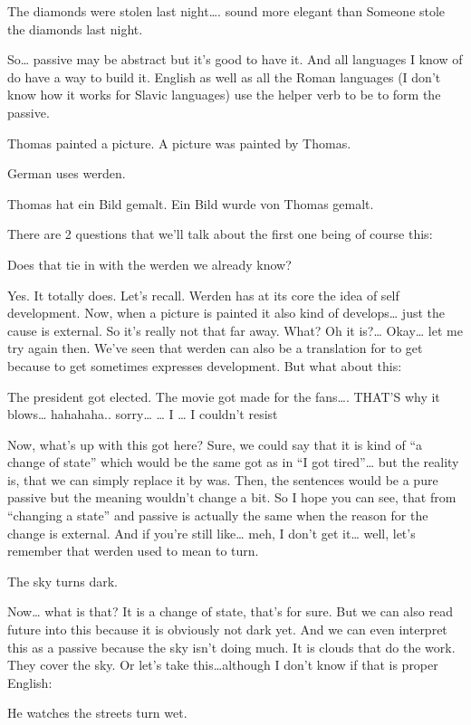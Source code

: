 \documentclass[a4paper,12pt]{article}
\begin{document}
\begin{adjustwidth}{2em}{0pt}
\begin{adjustwidth}{3em}{0pt}
    The diamonds were stolen last night…. sound more elegant than
    Someone stole the diamonds last night.

So… passive may be abstract but it’s good to have it. And all languages I know of do have a way to build it. English as well as all the Roman languages (I don’t know how it works for Slavic languages) use the helper verb to be to form the passive.

    Thomas painted a picture.
    A picture was painted by Thomas.

German uses werden.

    Thomas hat ein Bild gemalt.
    Ein Bild wurde von Thomas gemalt.

There are 2 questions that we’ll talk about the first one being of course this:

Does that tie in with the werden we already know?

Yes. It totally does. Let’s recall. Werden has at its core the idea of self development. Now, when a picture is painted it also kind of develops… just the cause is external. So it’s really not that far away. What? Oh it is?… Okay… let me try again then. We’ve seen that werden can also be a translation for to get because to get sometimes expresses development. But what about this:

    The president got elected.
    The movie got made for the fans…. THAT’S why it blows… hahahaha.. sorry… … I … I  couldn’t resist

Now, what’s up with this got here? Sure, we could say that it is kind of “a change of state” which would be the same got as in “I got tired”… but the reality is, that we can simply replace it by was. Then, the sentences would be a pure passive but the meaning wouldn’t change a bit. So I hope you can see, that from “changing a state” and passive is actually the same when the reason for the change is external.
And if you’re still like… meh, I don’t get it… well, let’s remember that werden used to mean to turn.

    The sky turns dark.

Now… what is that? It is a change of state, that’s for sure. But we can also read future into this because it is obviously not dark yet. And we can even interpret this as a passive because the sky isn’t doing much. It is clouds that do the work. They cover the sky. Or let’s take this…although I don’t know if that is proper English:

    He watches the streets turn wet.


\end{adjustwidth}
\end{adjustwidth}
\end{document}
